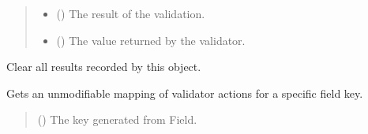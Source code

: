 \documentclass[letterpaper,10pt,english]{sphinxmanual}
\begin{document}
\begin{fulllineitems}
\begin{fulllineitems}
\begin{quote}
\begin{description}
\begin{itemize}
\item {} 
\sphinxAtStartPar
{} () \textendash{} The result of the validation.

\item {} 
\sphinxAtStartPar
{} (\sphinxstyleliteralemphasis{\sphinxupquote{, }}) \textendash{} The value returned by the validator.

\end{itemize}

\end{description}\end{quote}

\end{fulllineitems}


\begin{fulllineitems}
\label{\detokenize{apache_commons_validator_python:apache_commons_validator_python.validator_results_new.ValidatorResults.clear}}
\pysigstartsignatures
{}
\pysigstopsignatures
\sphinxAtStartPar
Clear all results recorded by this object.

\end{fulllineitems}


\begin{fulllineitems}
\label{\detokenize{apache_commons_validator_python:apache_commons_validator_python.validator_results_new.ValidatorResults.get_action_map}}
\pysigstartsignatures
{}
\pysigstopsignatures
\sphinxAtStartPar
Gets an unmodifiable mapping of validator actions for a specific field key.
\begin{quote}\begin{description}
\sphinxAtStartPar
{} () \textendash{} The key generated from Field.


\end{description}
\end{quote}
\end{fulllineitems}
\end{fulllineitems}
\end{document}
